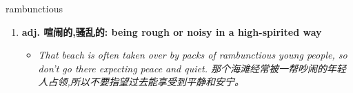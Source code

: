 
\begin{frame}
{\huge rambunctious}
\begin{center}
\begin{enumerate}\Large
  \item \textbf{adj. 喧闹的,骚乱的: being rough or noisy in a high-spirited way}
  \begin{itemize}
    \item \em{\Large{That beach is often taken over by packs of rambunctious young people, so don't go there expecting peace and quiet. 那个海滩经常被一帮吵闹的年轻人占领,所以不要指望过去能享受到平静和安宁。}}
  \end{itemize}
\end{enumerate}
\end{center}
\end{frame}
